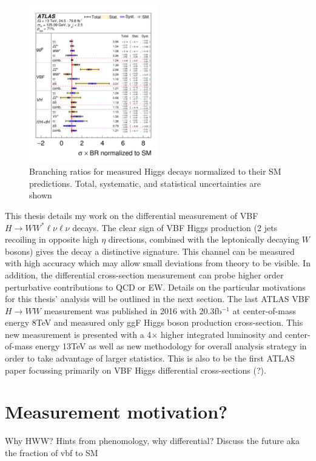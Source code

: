 \begin{figure}[H]
        \centering
    \includegraphics[width=0.5\textwidth] {Pictures/branchingratio.png}\hspace{1cm}
    \caption{Branching ratios for measured Higgs decays normalized to their SM predictions. Total, systematic, and statistical uncertainties are shown \cite{HiggsCurrent}}
    \label{fig:branchingratio}
\end{figure}
This thesis details my work on the differential measurement of VBF $H\rightarrow WW^*\ell\nu\ell\nu$ decays. The clear sign of VBF Higgs production (2 jets recoiling in opposite high $\eta$ directions, combined with the leptonically decaying $W$ bosons) gives the decay a distinctive signature. This channel can be measured with high accuracy which may allow small deviations from theory to be visible. In addition, the differential cross-section measurement can probe higher order perturbative contributions to QCD or EW. Details on the particular motivations for this thesis' analysis will be outlined in the next section. The last ATLAS VBF $H\rightarrow WW$ measurement was published in 2016 with 20.3fb$^{-1}$ at center-of-mass energy 8TeV and measured only ggF Higgs boson production cross-section\cite{HiggsDifferential}. This new measurement is presented with a 4$\times$ higher integrated luminosity and center-of-mass energy 13TeV as well as new methodology for overall analysis strategy in order to take advantage of larger statistics. This is also to be the first ATLAS paper focussing primarily on VBF Higgs differential cross-sections (?). 

\section{Measurement motivation?}
Why HWW? 
Hints from phenomology, why differential? 
Discuss the future aka the fraction of vbf to SM

